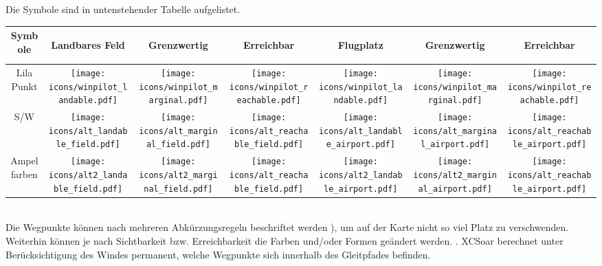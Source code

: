 Die Symbole sind in untenstehender Tabelle aufgelistet. 

\begin{tabular}{c|ccc|ccc|}
Symbole
&\begin{sideways}Landbares Feld\end{sideways}
&\begin{sideways}Grenzwertig\end{sideways}
&\begin{sideways}Erreichbar\end{sideways}
&\begin{sideways}Flugplatz\end{sideways}
&\begin{sideways}Grenzwertig\end{sideways}
&\begin{sideways}Erreichbar\end{sideways}\\
\hline
Lila Punkt &
\texttt{[image: icons/winpilot\_landable.pdf]} &
\texttt{[image: icons/winpilot\_marginal.pdf]} &
\texttt{[image: icons/winpilot\_reachable.pdf]} &
\colorbox{white}{\texttt{[image: icons/winpilot\_landable.pdf]}} &
\texttt{[image: icons/winpilot\_marginal.pdf]} &
\texttt{[image: icons/winpilot\_reachable.pdf]} \\
\hline
S/W &
\texttt{[image: icons/alt\_landable\_field.pdf]} &
\texttt{[image: icons/alt\_marginal\_field.pdf]} &
\texttt{[image: icons/alt\_reachable\_field.pdf]} &
\colorbox[rgb]{0.94,0.94,0.94}{\texttt{[image: icons/alt\_landable\_airport.pdf]}} &
\texttt{[image: icons/alt\_marginal\_airport.pdf]} &
\texttt{[image: icons/alt\_reachable\_airport.pdf]} \\
\hline
Ampelfarben &
\texttt{[image: icons/alt2\_landable\_field.pdf]} &
\texttt{[image: icons/alt2\_marginal\_field.pdf]} &
\texttt{[image: icons/alt\_reachable\_field.pdf]} &
\colorbox{white}{\texttt{[image: icons/alt2\_landable\_airport.pdf]}} &
\texttt{[image: icons/alt2\_marginal\_airport.pdf]} &
\texttt{[image: icons/alt\_reachable\_airport.pdf]} \\
\hline
\end{tabular} \\

Die Wegpunkte können nach mehreren Abkürzungsregeln beschriftet werden ), um auf der Karte nicht so viel Platz zu verschwenden.  Weiterhin können je nach Sichtbarkeit bzw. Erreichbarkeit die Farben und/oder Formen geändert werden. . \textsf{XCSoar} berechnet unter Berücksichtigung des Windes permanent, welche Wegpunkte sich innerhalb des Gleitpfades befinden.

